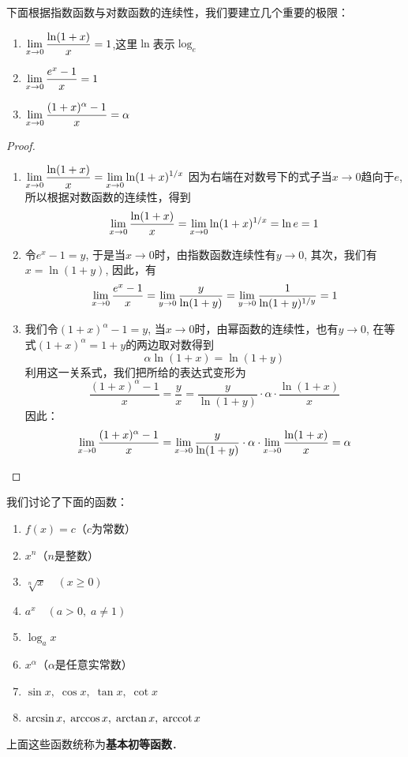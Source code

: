 下面根据指数函数与对数函数的连续性，我们要建立几个重要的极限：
\begin{enumerate}
    \item $\displaystyle\lim_{x\to 0} \dfrac{\ln(1+x)}{x}=1$,\quad 这里$\ln$表示$\log_e$
    \item $\displaystyle\lim_{x\to 0}\dfrac{e^x-1}{x}=1$
    \item $\displaystyle\lim_{x\to 0}\dfrac{(1+x)^\alpha -1}{x}=\alpha$
\end{enumerate}

\begin{proof}
\begin{enumerate}
    \item $\displaystyle\lim_{x\to 0} \dfrac{\ln(1+x)}{x}=\displaystyle\lim_{x\to 0} \ln(1+x)^{1/x}$
    因为右端在对数号下的式子当$x\to 0$趋向于$e$, 所以根据对数函数的连续性，得到
\[\displaystyle\lim_{x\to 0} \dfrac{\ln(1+x)}{x}=\displaystyle\lim_{x\to 0} \ln(1+x)^{1/x}=\ln e=1\]
\item 令$e^x-1=y$, 于是当$x\to 0$时，由指数函数连续性有$y\to 0$, 其次，我们有$x=\ln(1+y)$, 因此，有
\[\displaystyle\lim_{x\to 0}\dfrac{e^x-1}{x}=\displaystyle\lim_{y\to 0}\dfrac{y}{\ln(1+y)}=\displaystyle\lim_{y\to 0}\dfrac{1}{\ln(1+y)^{1/y}}=1\]
\item 我们令$(1+x)^{\alpha}-1=y$, 当$x\to 0$时，由幂函数的连续性，也有$y\to 0$, 在等式$(1+x)^{\alpha}=1+y$的两边取对数得到
\[\alpha\ln (1+x) =\ln (1+y) \]
利用这一关系式，我们把所给的表达式变形为
\[\frac{(1+x)^\alpha-1}{x}=\frac{y}{x}=\frac{y}{\ln(1+y)}\cdot \alpha\cdot\frac{\ln(1+x)}{x}\]
因此：
\[\displaystyle\lim_{x\to 0} \dfrac{(1+x)^\alpha-1}{x}=   \displaystyle\lim_{x\to 0} \dfrac{y}{\ln(1+y)}\cdot \alpha\cdot   \displaystyle\lim_{x\to 0}  \dfrac{\ln(1+x)}{x}=\alpha\]
\end{enumerate}
\end{proof}

我们讨论了下面的函数：
\begin{enumerate}
    \item $f(x)=c$\quad （$c$为常数）
    \item $x^n$\quad（$n$是整数）
    \item $\sqrt[n]{x}\quad (x\ge 0)$
    \item $a^x\quad (a>0,\; a\ne 1)$
    \item $\log_a x$
    \item $x^\alpha$\quad （$\alpha$是任意实常数）
    \item $\sin x,\; \cos x, \; \tan x,\; \cot x$
    \item $\arcsin x,\; \arccos x, \; \arctan x,\; \operatorname{arccot} x$
\end{enumerate}
上面这些函数统称为\textbf{基本初等函数}．

